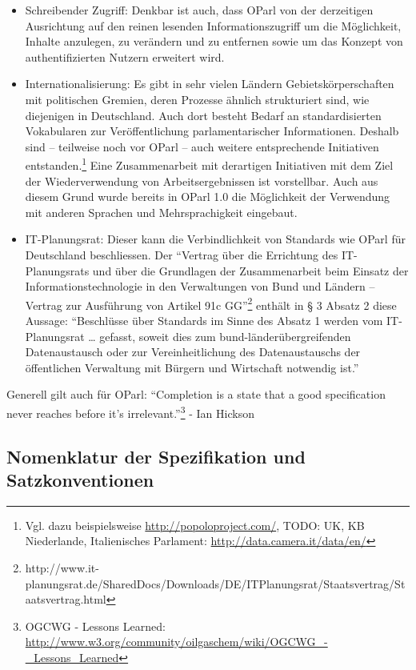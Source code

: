 \documentclass[,a4paper]{article}
\begin{document}
\begin{itemize}
  des W3C und das Hydra Core Vocabulary\footnote{http://hydra-cg.com/spec/latest/core/\#collections}
  beobachtet.
\item
  Schreibender Zugriff: Denkbar ist auch, dass OParl von der derzeitigen
  Ausrichtung auf den reinen lesenden Informationszugriff um die
  Möglichkeit, Inhalte anzulegen, zu verändern und zu entfernen sowie um
  das Konzept von authentifizierten Nutzern erweitert wird.
\item
  Internationalisierung: Es gibt in sehr vielen Ländern
  Gebietskörperschaften mit politischen Gremien, deren Prozesse ähnlich
  strukturiert sind, wie diejenigen in Deutschland. Auch dort besteht
  Bedarf an standardisierten Vokabularen zur Veröffentlichung
  parlamentarischer Informationen. Deshalb sind -- teilweise noch vor
  OParl -- auch weitere entsprechende Initiativen entstanden.\footnote{Vgl.
    dazu beispielsweise \url{http://popoloproject.com/}, TODO: UK, KB
    Niederlande, Italienisches Parlament:
    \url{http://data.camera.it/data/en/}} Eine Zusammenarbeit mit
  derartigen Initiativen mit dem Ziel der Wiederverwendung von
  Arbeitsergebnissen ist vorstellbar. Auch aus diesem Grund wurde
  bereits in OParl 1.0 die Möglichkeit der Verwendung mit anderen
  Sprachen und Mehrsprachigkeit eingebaut.
\item
  IT-Planungsrat: Dieser kann die Verbindlichkeit von Standards wie
  OParl für Deutschland beschliessen. Der ``Vertrag über die Errichtung
  des IT-Planungsrats und über die Grundlagen der Zusammenarbeit beim
  Einsatz der Informationstechnologie in den Verwaltungen von Bund und
  Ländern -- Vertrag zur Ausführung von Artikel 91c GG''\footnote{http://www.it-planungsrat.de/SharedDocs/Downloads/DE/ITPlanungsrat/Staatsvertrag/Staatsvertrag.html}
  enthält in § 3 Absatz 2 diese Aussage: ``Beschlüsse über Standards im
  Sinne des Absatz 1 werden vom IT-Planungsrat \ldots{} gefasst, soweit
  dies zum bund-länderübergreifenden Datenaustausch oder zur
  Vereinheitlichung des Datenaustauschs der öffentlichen Verwaltung mit
  Bürgern und Wirtschaft notwendig ist.''
\end{itemize}

Generell gilt auch für OParl: ``Completion is a state that a good
specification never reaches before it's irrelevant.''\footnote{OGCWG -
  Lessons Learned:
  \url{http://www.w3.org/community/oilgaschem/wiki/OGCWG_-_Lessons_Learned}}
- Ian Hickson

\subsection{Nomenklatur der Spezifikation und
Satzkonventionen}\label{nomenklatur-der-spezifikation-und-satzkonventionen}
\end{document}
